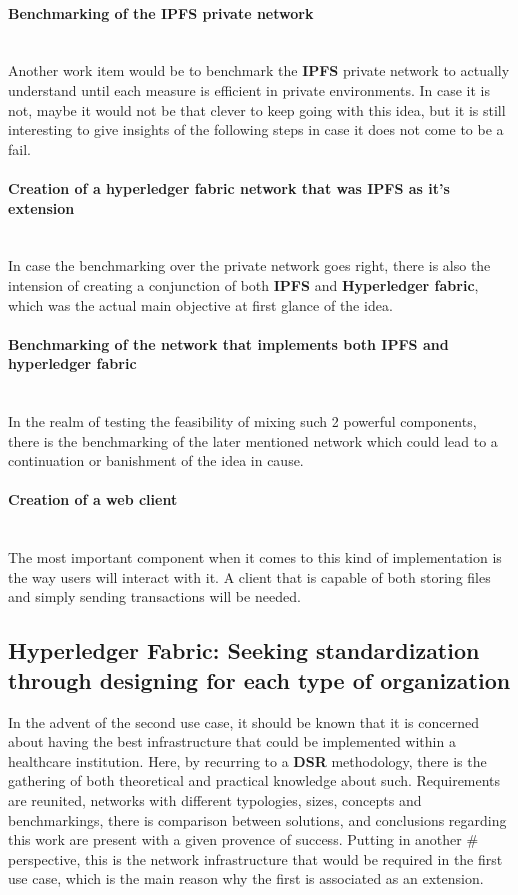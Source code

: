 \paragraph{Benchmarking of the IPFS private network} \mbox{} \\
Another work item would be to benchmark the \textbf{IPFS} private network to actually understand until each measure is efficient in private 
environments. In case it is not, maybe it would not be that clever to keep going with this idea, but it is still interesting to give 
insights of the following steps in case it does not come to be a fail.

\paragraph{Creation of a hyperledger fabric network that was IPFS as it's extension} \mbox{} \\
In case the benchmarking over the private network goes right, there is also the intension of creating a conjunction of both 
\textbf{IPFS} and \textbf{Hyperledger fabric}, which was the actual main objective at first glance of the idea.

\paragraph{Benchmarking of the network that implements both IPFS and hyperledger fabric} \mbox{} \\
In the realm of testing the feasibility of mixing such 2 powerful components, there is the benchmarking of the later mentioned network 
which could lead to a continuation or banishment of the idea in cause.

\paragraph{Creation of a web client} \mbox{} \\
The most important component when it comes to this kind of implementation is the way users will interact with it. A client that is capable 
of both storing files and simply sending transactions will be needed.

\subsection{Hyperledger Fabric: Seeking standardization through designing for each type of organization}

In the advent of the second use case, it should be known that it is concerned about having the best infrastructure that could be 
implemented within a healthcare institution. Here, by recurring to a \textbf{DSR} methodology, there is the gathering of both theoretical 
and practical knowledge about such. Requirements are reunited, networks with different typologies, sizes, concepts and benchmarkings, 
there is comparison between solutions, and conclusions regarding this work are present with a given provence of success. Putting in another #
perspective, this is the network infrastructure that would be required in the first use case, which is the main reason why the first is 
associated as an extension.

